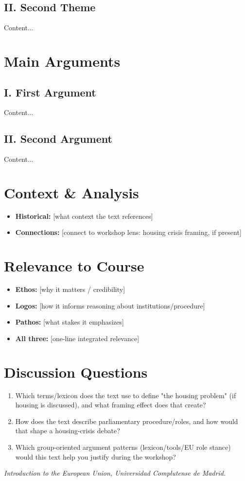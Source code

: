 \documentclass[11pt,a4paper]{article}
\begin{document}
\subsection*{II. Second Theme}
Content...

\section*{Main Arguments}
\subsection*{I. First Argument}
Content...

\subsection*{II. Second Argument}
Content...

\section*{Context \& Analysis}
\begin{itemize}
\item \textbf{Historical:} [what context the text references]
\item \textbf{Connections:} [connect to workshop lens: housing crisis framing, if present]
\end{itemize}

\section*{Relevance to Course}
\begin{itemize}
\item \textbf{Ethos:} [why it matters / credibility]
\item \textbf{Logos:} [how it informs reasoning about institutions/procedure]
\item \textbf{Pathos:} [what stakes it emphasizes]
\item \textbf{All three:} [one-line integrated relevance]
\end{itemize}

\section*{Discussion Questions}
\begin{enumerate}
\item Which terms/lexicon does the text use to define "the housing problem" (if housing is discussed), and what framing effect does that create?
\item How does the text describe parliamentary procedure/roles, and how would that shape a housing-crisis debate?
\item Which group-oriented argument patterns (lexicon/tools/EU role stance) would this text help you justify during the workshop?
\end{enumerate}

\vspace{1em}
\noindent\footnotesize\textit{Introduction to the European Union, Universidad Complutense de Madrid.}
\end{document}
